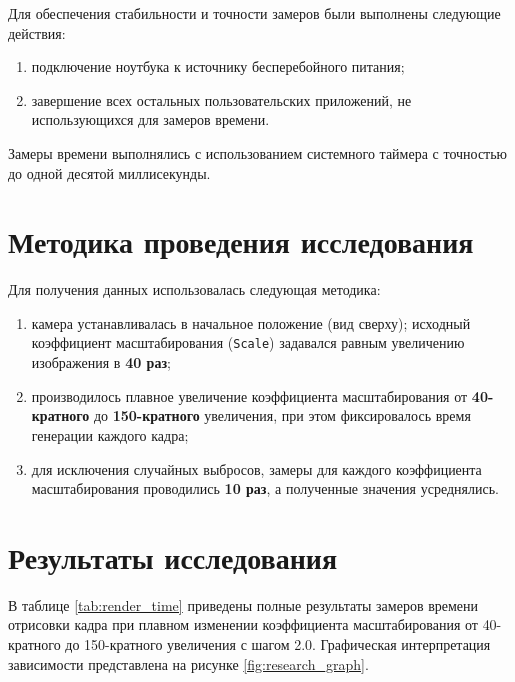 Для обеспечения стабильности и точности замеров были выполнены следующие действия:
\begin{enumerate}
	\item подключение ноутбука к источнику бесперебойного питания;
	\item завершение всех остальных пользовательских приложений, не использующихся для замеров времени.
\end{enumerate}

Замеры времени выполнялись с использованием системного таймера с точностью до одной десятой миллисекунды.

\section{Методика проведения исследования}

Для получения данных использовалась следующая методика:
\begin{enumerate}
	\item камера устанавливалась в начальное положение (вид сверху); исходный коэффициент масштабирования (\texttt{Scale}) задавался равным увеличению изображения в \textbf{40 раз};
	\item производилось плавное увеличение коэффициента масштабирования от \textbf{40-кратного} до \textbf{150-кратного} увеличения, при этом фиксировалось время генерации каждого кадра;
	\item для исключения случайных выбросов, замеры для каждого коэффициента масштабирования проводились \textbf{10 раз}, а полученные значения усреднялись.
\end{enumerate}


\section{Результаты исследования}

В таблице \ref{tab:render_time} приведены полные результаты замеров времени отрисовки кадра при плавном изменении коэффициента масштабирования от 40-кратного до 150-кратного увеличения с шагом 2.0. Графическая интерпретация зависимости представлена на рисунке \ref{fig:research_graph}.



